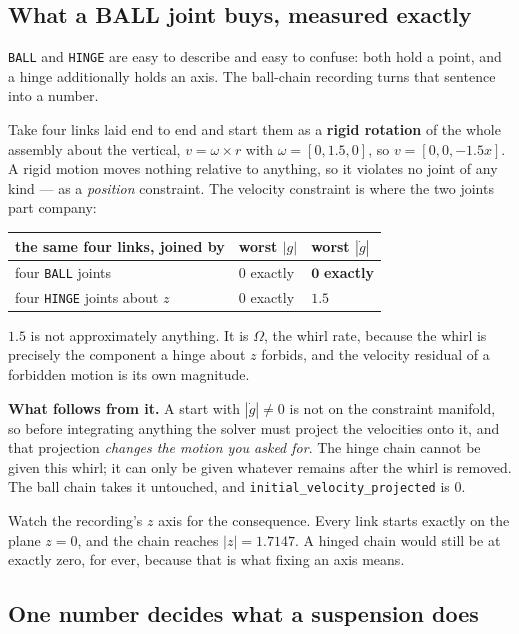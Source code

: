 \documentclass[11pt]{article}
\newcommand{\kw}[1]{\texttt{\uppercase{#1}}}
\newcommand{\code}[1]{\texttt{#1}}
\begin{document}
\subsection{What a BALL joint buys, measured exactly}

\kw{ball} and \kw{hinge} are easy to describe and easy to confuse: both
hold a point, and a hinge additionally holds an axis. The ball-chain
recording turns that sentence into a number.

Take four links laid end to end and start them as a \textbf{rigid
rotation} of the whole assembly about the vertical,
$v = \omega \times r$ with $\omega = [0, 1.5, 0]$, so
$v = [0, 0, -1.5x]$. A rigid motion moves nothing relative to anything,
so it violates no joint of any kind --- as a \emph{position} constraint.
The velocity constraint is where the two joints part company:

\begin{center}
\begin{tabular}{p{6.4cm}p{2.6cm}p{2.6cm}}
\textbf{the same four links, joined by} & \textbf{worst $|g|$} &
\textbf{worst $|\dot g|$}\\\hline
four \kw{ball} joints & $0$ exactly & $\mathbf{0}$ \textbf{exactly}\\
four \kw{hinge} joints about $z$ & $0$ exactly & $\mathbf{1.5}$\\
\end{tabular}
\end{center}

$1.5$ is not approximately anything. It is $\Omega$, the whirl rate,
because the whirl is precisely the component a hinge about $z$ forbids,
and the velocity residual of a forbidden motion is its own magnitude.

\textbf{What follows from it.} A start with $|\dot g| \neq 0$ is not on
the constraint manifold, so before integrating anything the solver must
project the velocities onto it, and that projection \emph{changes the
motion you asked for}. The hinge chain cannot be given this whirl; it
can only be given whatever remains after the whirl is removed. The ball
chain takes it untouched, and \code{initial\_velocity\_projected} is
$0$.

Watch the recording's $z$ axis for the consequence. Every link starts
exactly on the plane $z = 0$, and the chain reaches $|z| = 1.7147$. A
hinged chain would still be at exactly zero, for ever, because that is
what fixing an axis means.

\subsection{One number decides what a suspension does}
\end{document}
